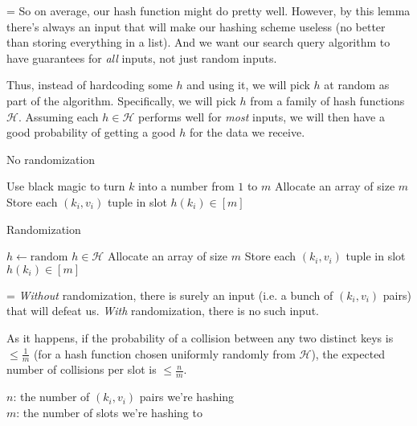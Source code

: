 \documentclass[11pt]{article}
\begin{document}
{\parskip=\baselineskip
So on average, our hash function might do pretty well. However, by this lemma there's always an input that will make our hashing scheme useless (no better than storing everything in a list). And we want our search query algorithm to have guarantees for \textit{all} inputs, not just random inputs.

Thus, instead of hardcoding some $h$ and using it, we will pick $h$ at random as part of the algorithm. Specifically, we will pick $h$ from a family of hash functions $\mathcal{H}$. Assuming each $h \in \mathcal{H}$ performs well for \textit{most} inputs, we will then have a good probability of getting a good $h$ for the data we receive.

\begin{algorithm}
\caption{No randomization}
\begin{algorithmic}[1]
\State Use black magic to turn $k$ into a number from $1$ to $m$
\EndProcedure
{}
\State Allocate an array of size $m$
\State Store each $(k_i, v_i)$ tuple in slot $h(k_i) \in [m]$
\EndProcedure
\end{algorithmic}
\end{algorithm}

\begin{algorithm}
\caption{Randomization}
\begin{algorithmic}[1]
\State $h \gets \text{random $h \in \mathcal{H}$}$
\State Allocate an array of size $m$
\State Store each $(k_i, v_i)$ tuple in slot $h(k_i) \in [m]$
\EndProcedure
\end{algorithmic}
\end{algorithm}
}

{\parskip=\baselineskip
\textit{Without} randomization, there is surely an input (i.e. a bunch of $(k_i, v_i)$ pairs) that will defeat us.
\textit{With} randomization, there is no such input.

As it happens, if the probability of a collision between any two distinct keys is $\leq \frac{1}{m}$ (for a hash function chosen uniformly randomly from $\mathcal{H}$), the expected number of collisions per slot is $\leq \frac{n}{m}$.
}

\begin{flushright}
$n$: the number of $(k_i, v_i)$ pairs we're hashing \\
$m$: the number of slots we're hashing to
\end{flushright}
\end{document}
